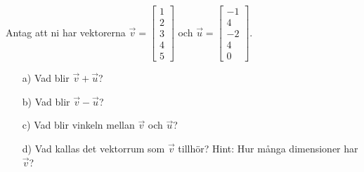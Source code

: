 Antag att ni har vektorerna $\vec{v}=\begin{bmatrix}1 \\ 2 \\ 3 \\ 4 \\ 5 \end{bmatrix}$ och $\vec{u}=\begin{bmatrix}-1 \\ 4 \\ -2 \\ 4 \\ 0 \end{bmatrix}$.
\begin{itemize}
\item[a) ] Vad blir $\vec{v}+\vec{u}$?
\item[b) ] Vad blir $\vec{v}-\vec{u}$?
\item[c) ] Vad blir vinkeln mellan $\vec{v}$ och $\vec{u}$?
\item[d) ] Vad kallas det vektorrum som $\vec{v}$ tillhör? Hint: Hur många dimensioner har $\vec{v}$? 
\end{itemize}